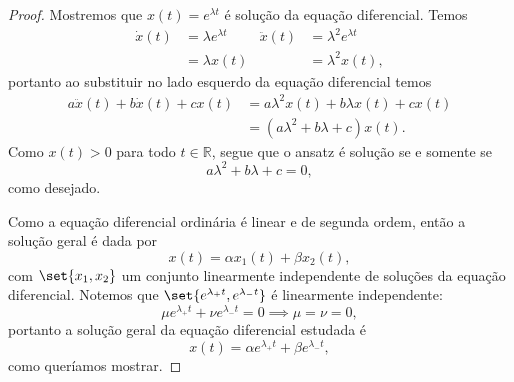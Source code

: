\begin{proof}
    Mostremos que \(x(t) = e^{\lambda t}\) é solução da equação diferencial. Temos
    \begin{align*}
        \dot{x}(t) &= \lambda e^{\lambda t}& \ddot{x}(t) &= \lambda^2 e^{\lambda t}\\ &= \lambda x(t) & &= \lambda^2 x(t),
    \end{align*}
    portanto ao substituir no lado esquerdo da equação diferencial temos
    \begin{align*}
        a \ddot{x}(t) + b\dot{x}(t) + cx(t) &= a \lambda^2 x(t) + b \lambda x(t) + c x(t)\\
                                            &= \left(a \lambda^2 + b \lambda + c\right)x(t).
    \end{align*}
    Como \(x(t) > 0\) para todo \(t \in \mathbb{R}\), segue que o ansatz é solução se e somente se
    \begin{equation*}
        a \lambda^2 + b \lambda + c = 0,
    \end{equation*}
    como desejado.

    Como a equação diferencial ordinária é linear e de segunda ordem, então a solução geral é dada por
    \begin{equation*}
        x(t) = \alpha x_1(t) + \beta x_2(t),
    \end{equation*}
    com \(\set{x_1, x_2}\) um conjunto linearmente independente de soluções da equação diferencial. Notemos que \(\set{e^{\lambda_+ t}, e^{\lambda_- t}}\) é linearmente independente:
    \begin{equation*}
        \mu e^{\lambda_+ t} + \nu e^{\lambda_- t} = 0 \implies \mu = \nu = 0,
    \end{equation*}
    portanto a solução geral da equação diferencial estudada é
    \begin{equation*}
        x(t) = \alpha e^{\lambda_+ t} + \beta e^{\lambda_- t},
    \end{equation*}
    como queríamos mostrar.
\end{proof}

